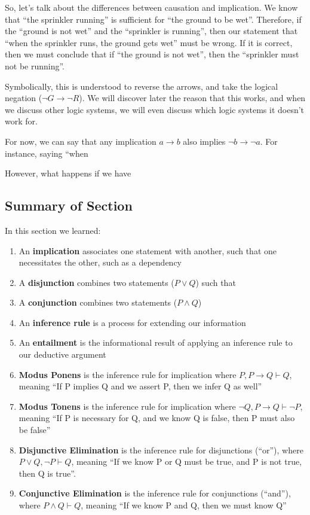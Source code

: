 So, let's talk about the differences between causation and implication. We know that ``the sprinkler running'' is sufficient for ``the ground to be wet''. Therefore, if the ``ground is not wet'' and the ``sprinkler is running'', then our statement that ``when the sprinkler runs, the ground gets wet'' must be wrong. If it is correct, then we must conclude that if ``the ground is not wet'', then the ``sprinkler must not be running''.

Symbolically, this is understood to reverse the arrows, and take the logical negation ($\neg G \to \neg R$). We will discover later the reason that this works, and when we discuss other logic systems, we will even discuss which logic systems it doesn't work for.

For now, we can say that any implication $a \to b$ also implies $\neg b \to \neg a$. For instance, saying ``when 

However, what happens if we have  


\subsection{Summary of Section}

In this section we learned:
\begin{enumerate}
    \item An \textbf{implication} associates one statement with another, such that one necessitates the other, such as a dependency
    \item A \textbf{disjunction} combines two statements ($P \vee Q$) such that
    \item A \textbf{conjunction} combines two statements ($P \wedge Q$)
    \item An \textbf{inference rule} is a process for extending our information
    \item An \textbf{entailment} is the informational result of applying an inference rule to our deductive argument
    \item \textbf{Modus Ponens} is the inference rule for implication where $P, P \to Q \vdash Q$, meaning ``If P implies Q and we assert P, then we infer Q as well''
    \item \textbf{Modus Tonens} is the inference rule for implication where $\neg Q, P \to Q \vdash \neg P$, meaning ``If P is necessary for Q, and we know Q is false, then P must also be false''
    \item \textbf{Disjunctive Elimination} is the inference rule for disjunctions (``or''), where $P \vee Q, \neg P \vdash Q$, meaning ``If we know P or Q must be true, and P is not true, then Q is true''.
    \item \textbf{Conjunctive Elimination} is the inference rule for conjunctions (``and''), where $P \wedge Q \vdash Q$, meaning ``If we know P and Q, then we must know Q''
\end{enumerate}

